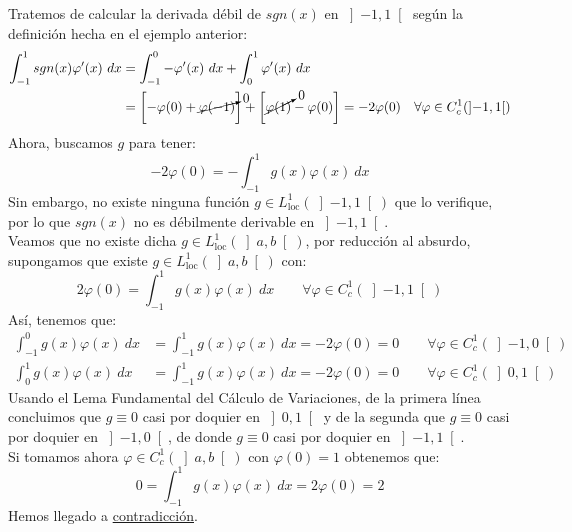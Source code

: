 \begin{ejemplo}
    Tratemos de calcular la derivada débil de $sgn(x)$ en $\left]-1,1\right[$ según la definición hecha en el ejemplo anterior:
    \begin{align*}
        \int_{-1}^{1} sgn(x)\varphi'(x)~dx &= \int_{-1}^{0} -\varphi'(x)~dx + \int_{0}^{1} \varphi'(x)~dx \\
                                           &= \left[-\varphi(0) + \cancelto{0}{\varphi(-1)}\right] + \left[\cancelto{0}{\varphi(1)} - \varphi(0)\right] = -2\varphi(0) \quad \forall \varphi \in C_c^1(\left]-1,1\right[)
    \end{align*}
    Ahora, buscamos $g$ para tener:
    \begin{equation*}
        -2\varphi(0) = -\int_{-1}^{1} g(x)\varphi(x)~dx 
    \end{equation*}
    Sin embargo, no existe ninguna función $g\in L^1_\text{loc}(\left]-1,1\right[)$ que lo verifique, por lo que $sgn(x)$ no es débilmente derivable en $\left]-1,1\right[$.\\

    \noindent
    Veamos que no existe dicha $g\in L^1_\text{loc}(\left]a,b\right[)$, por reducción al absurdo, supongamos que existe $g\in L^1_\text{loc}(\left]a,b\right[)$ con:
    \begin{equation*}
        2\varphi(0) = \int_{-1}^{1} g(x)\varphi(x)~dx  \qquad \forall \varphi \in C_c^1(\left]-1,1\right[)
    \end{equation*}
    Así, tenemos que:
    \begin{align*}
        \int_{-1}^{0} g(x)\varphi(x)~dx &= \int_{-1}^{1} g(x)\varphi(x)~dx = -2\varphi(0) = 0 \qquad \forall \varphi \in C_c^1(\left]-1,0\right[) \\
        \int_{0}^{1} g(x)\varphi(x)~dx &= \int_{-1}^{1} g(x)\varphi(x)~dx = -2\varphi(0) = 0 \qquad \forall \varphi \in C_c^1(\left]0,1\right[)
    \end{align*}
    Usando el Lema Fundamental del Cálculo de Variaciones, de la primera línea concluimos que $g\equiv 0$ casi por doquier en $\left]0,1\right[$ y de la segunda que $g\equiv 0$ casi por doquier en $\left]-1,0\right[$, de donde $g\equiv 0$ casi por doquier en $\left]-1,1\right[$.\\

    \noindent
    Si tomamos ahora $\varphi \in C_c^1(\left]a,b\right[)$ con $\varphi(0) = 1$ obtenemos que:
    \begin{equation*}
        0 = \int_{-1}^{1} g(x)\varphi(x)~dx  = 2\varphi(0) = 2
    \end{equation*}
    Hemos llegado a \underline{contradicción}.
\end{ejemplo}

